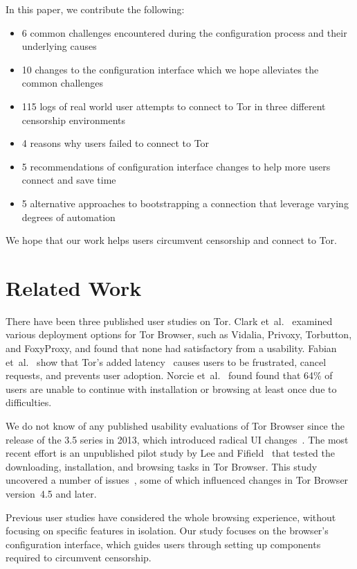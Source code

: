 \documentclass[USenglish,oneside,twocolumn]{article}
\begin{document}
In this paper, we contribute the following:
\smallskip
\begin{itemize}
\item 6 common challenges encountered during the configuration process and their underlying causes
\item 10 changes to the configuration interface which we hope alleviates the common challenges
\item 115 logs of real world user attempts to connect to Tor in three different censorship environments
\item 4 reasons why users failed to connect to Tor
\item 5 recommendations of configuration interface changes to help more users connect and save time
\item 5 alternative  approaches to bootstrapping a connection that leverage varying degrees of automation
\end{itemize}
We hope that our work helps users circumvent censorship and connect to Tor. 

\section{Related Work} 
There have been three published user studies on Tor. Clark et~al.~\cite{clark2007usability} examined various deployment
options for Tor Browser, such as Vidalia, Privoxy, Torbutton, and FoxyProxy, and found that none had satisfactory from a usability. Fabian et~al.~\cite{fabian2010privately} show that Tor's added
latency~\cite{dingledine2009performance} causes users
to be frustrated, cancel requests, and prevents user adoption. 
Norcie et~al.~\cite{norcie2012eliminating} found found that 
64\% of users are unable to continue with installation or browsing at least once due to difficulties.

We do not know of any published usability evaluations of
Tor Browser since the release of the 3.5 series in 2013, which introduced radical UI changes~\cite{torbrowser-35}.
The most recent effort is an unpublished pilot study by Lee and Fifield~\cite{uxsprint} 
that tested the downloading, installation, and browsing tasks in Tor Browser.  This study uncovered a number of issues~\cite{uxsprint2015-tickets},
some of which influenced changes in Tor Browser version~4.5 and later.

Previous user studies have considered the whole browsing experience,
without focusing on specific features in isolation.
Our study focuses on 
the browser's configuration interface, which guides users through setting up components required to circumvent censorship. 
\end{document}
